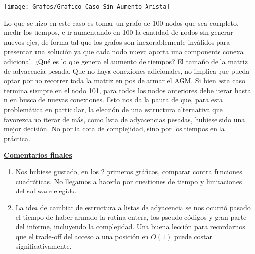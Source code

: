 \texttt{[image: Grafos/Grafico\_Caso\_Sin\_Aumento\_Arista]}

Lo que se hizo en este caso es tomar un grafo de 100 nodos que sea completo, medir los tiempos, e ir aumentando en 100 la cantidad de nodos sin generar nuevos ejes, de forma tal que los grafos son inexorablemente inválidos para presentar una solución ya que cada nodo nuevo aporta una componente conexa adicional. ¿Qué es lo que genera el aumento de tiempos? El tamaño de la matriz de adyacencia pesada. Que no haya conexiones adicionales, no implica que pueda optar por no recorrer toda la matriz en pos de armar el AGM. Si bien esta caso termina siempre en el nodo 101, para todos los nodos anteriores debe iterar hasta n en busca de nuevas conexiones. Esto nos da la pauta de que, para esta problemática en particular, la elección de una estructura alternativa que favorezca no iterar de más, como lista de adyacencias pesadas, hubiese sido una mejor decisión. No por la cota de complejidad, sino por los tiempos en la práctica.

\noindent \textbf{\underline{Comentarios finales}}

\begin{enumerate}
\item Nos hubiese gustado, en los 2 primeros gráficos, comparar contra funciones cuadráticas. No llegamos a hacerlo por cuestiones de tiempo y limitaciones del software elegido.
\item La idea de cambiar de estructura a listas de adyacencia se nos ocurrió pasado el tiempo de haber armado la rutina entera, los pseudo-códigos y gran parte del informe, incluyendo la complejidad. Una buena lección para recordarnos que el trade-off del acceso a una posición en $O(1)$ puede costar significativamente.
\end{enumerate}
